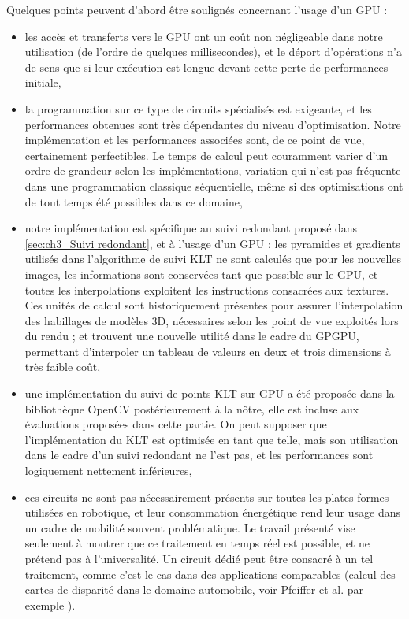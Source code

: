 Quelques points peuvent d'abord être soulignés concernant l'usage d'un GPU :
\begin{itemize}
	\item les accès et transferts vers le GPU ont un coût non négligeable dans notre utilisation (de l'ordre de quelques millisecondes), et le déport d'opérations n'a de sens que si leur exécution est longue devant cette perte de performances initiale,\\
	
	\item la programmation sur ce type de circuits spécialisés est exigeante, et les performances obtenues sont très dépendantes du niveau d'optimisation. Notre implémentation et les performances associées sont, de ce point de vue, certainement perfectibles. Le temps de calcul peut couramment varier d'un ordre de grandeur selon les implémentations, variation qui n'est pas fréquente dans une programmation classique séquentielle, même si des optimisations ont de tout temps été possibles dans ce domaine,\\
	
	\item notre implémentation est spécifique au suivi redondant proposé dans \ref{sec:ch3_Suivi redondant}, et à l'usage d'un GPU : les pyramides et gradients utilisés dans l'algorithme de suivi KLT ne sont calculés que pour les nouvelles images, les informations sont conservées tant que possible sur le GPU, et toutes les interpolations exploitent les instructions consacrées aux textures. Ces unités de calcul sont historiquement présentes pour assurer l'interpolation des habillages de modèles 3D, nécessaires selon les point de vue exploités lors du rendu ; et trouvent une nouvelle utilité dans le cadre du GPGPU, permettant d'interpoler un tableau de valeurs en deux et trois dimensions à très faible coût,\\
	
	\item une implémentation du suivi de points KLT sur GPU a été proposée dans la bibliothèque OpenCV postérieurement à la nôtre, elle est incluse aux évaluations proposées dans cette partie. On peut supposer que l'implémentation du KLT est optimisée en tant que telle, mais son utilisation dans le cadre d'un suivi redondant ne l'est pas, et les performances sont logiquement nettement inférieures,\\
	
	\item ces circuits ne sont pas nécessairement présents sur toutes les plates-formes utilisées en robotique, et leur consommation énergétique rend leur usage dans un cadre de mobilité souvent problématique. Le travail présenté vise seulement à montrer que ce traitement en temps réel est possible, et ne prétend pas à l'universalité. Un circuit dédié peut être consacré à un tel traitement, comme c'est le cas dans des applications comparables (calcul des cartes de disparité dans le domaine automobile, voir Pfeiffer et al. par exemple \cite{Pfeiffer}).\\
\end{itemize}

